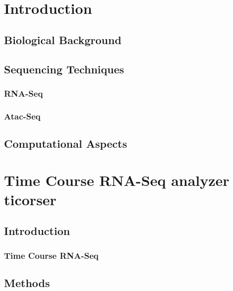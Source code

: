 \documentclass[b5paper,oneside,british,intoc,bibliograph=totoc,index=totoc,BCOR10mm,twoside,openright]{book}
\numberwithin{equation}{section}
\numberwithin{figure}{section}
\begin{document}

%
\newpage
\chapter{Introduction}


\section{Biological Background}


\section{Sequencing Techniques}
\subsection{RNA-Seq} \label{sec:rnaseq}

\subsection{Atac-Seq} \label{sec:atacseq}


\section{Computational Aspects}


\chapter{Time Course RNA-Seq analyzer \newline \textbf{ticorser}} \label{sec:ticorsercap}


\section{Introduction} \label{sec:ticorseintro}


\subsection{Time Course RNA-Seq} \label{sec:ticorsernaseq}

\section{Methods} \label{sec:ticorseintromethods}

\end{document}
